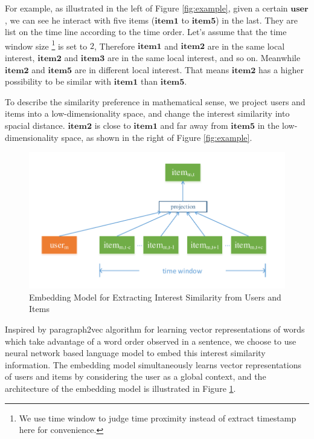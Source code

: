 \documentclass{sig-alternate-05-2015}
\begin{document}
For example, as illustrated in the left of Figure \ref{fig:example},
given a certain $\mathbf{user}$, we can see he interact with five items
($\mathbf{item1}$ to $\mathbf{item5}$) in the last.
They are list on the time line according to the time order.
Let's assume that the time window size \footnote{We use time window to judge time proximity
instead of extract timestamp here for convenience.} is set to $2$,
Therefore $\mathbf{item1}$ and $\mathbf{item2}$ are in the same local interest,
$\mathbf{item2}$ and $\mathbf{item3}$ are in the same local interest, and so on.
Meanwhile $\mathbf{item2}$ and $\mathbf{item5}$ are in different local interest.
That means $\mathbf{item2}$ has a higher possibility to be similar with $\mathbf{item1}$
than $\mathbf{item5}$.

To describe the similarity preference in mathematical sense,
we project users and items into a low-dimensionality space,
and change the interest similarity into spacial distance.
$\mathbf{item2}$ is close to $\mathbf{item1}$ and far away from $\mathbf{item5}$
in the low-dimensionality space, as shown in the right of Figure \ref{fig:example}.

\begin{figure}[htbp]
	\centering
	\includegraphics[scale=0.55]{images/2.pdf}
	\caption{Embedding Model for Extracting Interest Similarity from Users and Items}
	\label{fig:embedding}
\end{figure}

Inspired by paragraph2vec algorithm \cite{le2014distributed} for learning
vector representations of words which take advantage of
a word order observed in a sentence,
we choose to use neural network based language model
to embed this interest similarity information.
The embedding model simultaneously learns vector representations of users and items
by considering the user as a global context,
and the architecture of the embedding model is illustrated in Figure \ref{fig:embedding}.
\end{document}
